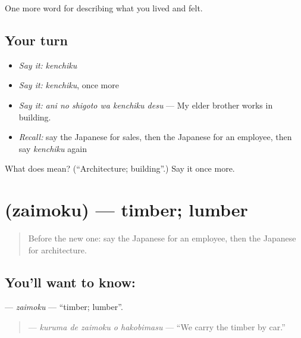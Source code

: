 \begin{grammarlens}[title={What you've built}]
One more word for describing what you lived and felt.
\end{grammarlens}

\subsection*{Your turn}
\begin{itemize}
\raggedright
  \item \emph{Say it:} \emph{kenchiku}
  \item \emph{Say it:} \emph{kenchiku}, once more
  \item \emph{Say it:} \emph{ani no shigoto wa kenchiku desu} — My elder brother works in building.
  \item \emph{Recall:} say the Japanese for sales, then the Japanese for an employee, then say \emph{kenchiku} again
\end{itemize}

\begin{tcolorbox}[breakable,colback=teal!4,colframe=teal!35!black,title={Before you move on}]
What does  mean? (\textquotedblleft{}Architecture; building\textquotedblright{}.) Say it once more.
\end{tcolorbox}
\section[\texorpdfstring{\ja{ざいもく} (zaimoku)}{ざいもく (zaimoku)}]{ (zaimoku) — timber; lumber}

\label{lesson:JA-C488-zaimoku}



\begin{quote}
Before the new one: say the Japanese for an employee, then the Japanese for architecture.
\end{quote}

\subsection*{You'll want to know: }
\textbf{} — \emph{zaimoku} — \textquotedblleft{}timber; lumber\textquotedblright{}.

\begin{quote}
\textbf{  } — \emph{kuruma de zaimoku o hakobimasu} — \textquotedblleft{}We carry the timber by car.\textquotedblright{}
\end{quote}


